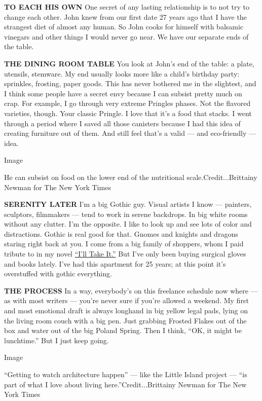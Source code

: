 \textbf{TO EACH HIS OWN} One secret of any lasting relationship is to
not try to change each other. John knew from our first date 27 years ago
that I have the strangest diet of almost any human. So John cooks for
himself with balsamic vinegars and other things I would never go near.
We have our separate ends of the table.

\textbf{THE DINING ROOM TABLE} You look at John's end of the table: a
plate, utensils, stemware. My end usually looks more like a child's
birthday party: sprinkles, frosting, paper goods. This has never
bothered me in the slightest, and I think some people have a secret envy
because I can subsist pretty much on crap. For example, I go through
very extreme Pringles phases. Not the flavored varieties, though. Your
classic Pringle. I love that it's a food that stacks. I went through a
period where I saved all those canisters because I had this idea of
creating furniture out of them. And still feel that's a valid --- and
eco-friendly --- idea.

Image

He can subsist on food on the lower end of the nutritional
scale.Credit...Brittainy Newman for The New York Times

\textbf{SERENITY LATER} I'm a big Gothic guy. Visual artists I know ---
painters, sculptors, filmmakers --- tend to work in serene backdrops. In
big white rooms without any clutter. I'm the opposite. I like to look up
and see lots of color and distractions. Gothic is real good for that.
Gnomes and knights and dragons staring right back at you. I come from a
big family of shoppers, whom I paid tribute to in my novel
\href{https://www.amazon.com/Ill-Take-Paul-Rudnick/dp/034536225X/ref=tmm_mmp_swatch_0?_encoding=UTF8\&qid=1598973991\&sr=1-1}{``I'll
Take It.''} But I've only been buying surgical gloves and books lately.
I've had this apartment for 25 years; at this point it's overstuffed
with gothic everything.

\textbf{THE PROCESS} In a way, everybody's on this freelance schedule
now where --- as with most writers --- you're never sure if you're
allowed a weekend. My first and most emotional draft is always longhand
in big yellow legal pads, lying on the living room couch with a big pen.
Just grabbing Frosted Flakes out of the box and water out of the big
Poland Spring. Then I think, ``OK, it might be lunchtime.'' But I just
keep going.

Image

``Getting to watch architecture happen'' --- like the Little Island
project --- ``is part of what I love about living
here.''Credit...Brittainy Newman for The New York Times

